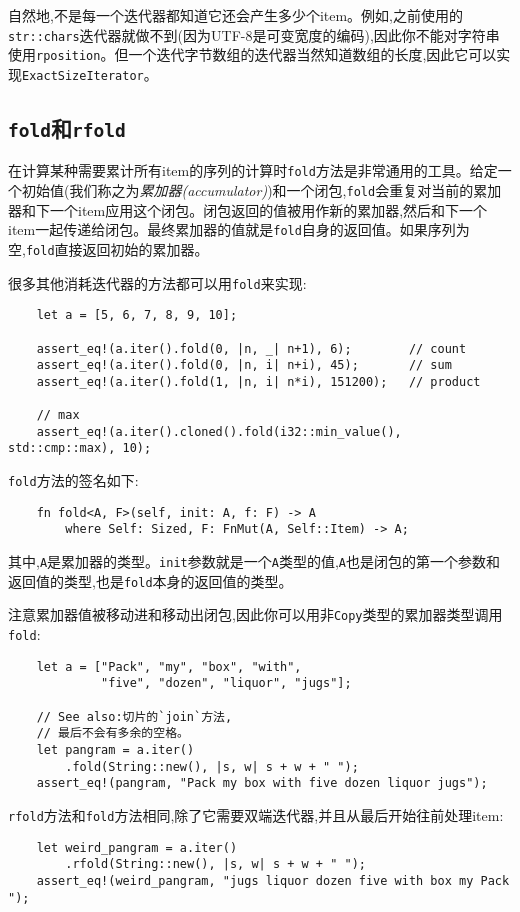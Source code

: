 自然地,不是每一个迭代器都知道它还会产生多少个item。例如,之前使用的\texttt{str::chars}迭代器就做不到(因为UTF-8是可变宽度的编码),因此你不能对字符串使用\texttt{rposition}。但一个迭代字节数组的迭代器当然知道数组的长度,因此它可以实现\texttt{ExactSizeIterator}。

\subsection{\texttt{fold}和\texttt{rfold}}
在计算某种需要累计所有item的序列的计算时\texttt{fold}方法是非常通用的工具。给定一个初始值(我们称之为\emph{累加器(accumulator)})和一个闭包,\texttt{fold}会重复对当前的累加器和下一个item应用这个闭包。闭包返回的值被用作新的累加器,然后和下一个item一起传递给闭包。最终累加器的值就是\texttt{fold}自身的返回值。如果序列为空,\texttt{fold}直接返回初始的累加器。

很多其他消耗迭代器的方法都可以用\texttt{fold}来实现:
\begin{verbatim}
    let a = [5, 6, 7, 8, 9, 10];

    assert_eq!(a.iter().fold(0, |n, _| n+1), 6);        // count
    assert_eq!(a.iter().fold(0, |n, i| n+i), 45);       // sum
    assert_eq!(a.iter().fold(1, |n, i| n*i), 151200);   // product

    // max
    assert_eq!(a.iter().cloned().fold(i32::min_value(), std::cmp::max), 10);
\end{verbatim}

\texttt{fold}方法的签名如下:
\begin{verbatim}
    fn fold<A, F>(self, init: A, f: F) -> A
        where Self: Sized, F: FnMut(A, Self::Item) -> A;
\end{verbatim}

其中,\texttt{A}是累加器的类型。\texttt{init}参数就是一个\texttt{A}类型的值,\texttt{A}也是闭包的第一个参数和返回值的类型,也是\texttt{fold}本身的返回值的类型。

注意累加器值被移动进和移动出闭包,因此你可以用非\texttt{Copy}类型的累加器类型调用\texttt{fold}:
\begin{verbatim}
    let a = ["Pack", "my", "box", "with",
             "five", "dozen", "liquor", "jugs"];
    
    // See also:切片的`join`方法,
    // 最后不会有多余的空格。
    let pangram = a.iter()
        .fold(String::new(), |s, w| s + w + " ");
    assert_eq!(pangram, "Pack my box with five dozen liquor jugs");
\end{verbatim}

\texttt{rfold}方法和\texttt{fold}方法相同,除了它需要双端迭代器,并且从最后开始往前处理item:
\begin{verbatim}
    let weird_pangram = a.iter()
        .rfold(String::new(), |s, w| s + w + " ");
    assert_eq!(weird_pangram, "jugs liquor dozen five with box my Pack ");
\end{verbatim}

